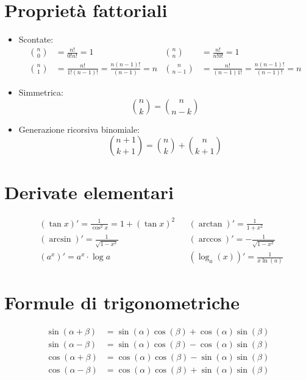  \section{Proprietà fattoriali}

\begin{itemize}
	\item Scontate:
	\begin{align*}
	\binom{n}{0} &=  \frac{n!}{0!n!}= 1 &  \binom{n}{n}&=  \frac{n!}{n!0!}= 1 \\
	\binom{n}{1} &=  \frac{n!}{1!\left( n-1 \right) !}=  \frac{n \left( n-1 \right) !}{\left( n-1 \right) }=n &  \binom{n}{n-1} &= \frac{n!}{\left( n-1 \right) 1!}= \frac{n\left( n-1 \right) !}{\left( n-1 \right) !}=n
	\end{align*}
	\item Simmetrica: 
	\[
	\binom{n}{k}= \binom{n}{n-k}
	\] 
	\item Generazione ricorsiva binomiale:
	\[
	\binom{n+1}{k+1} = \binom{n}{k} + \binom{n}{k+1}
	\]
\end{itemize}
\section{Derivate elementari}
\begin{align*}
	&\left( \tan x \right) ' = \frac{1}{\cos ^2 x}=  1 + \left( \tan x \right) ^2 && \left( \arctan  \right) ' =  \frac{1}{1+x^2}\\
	&\left( \arcsin \right) ' =  \frac{1}{\sqrt{1-x^2} }  &&\left( \arccos \right) ' =  -\frac{1}{\sqrt{1-x^2} }\\
	&\left( a^{x} \right) ' =  a^{x} \cdot \log a  && \left( \log _a \left( x \right)  \right) ' = \frac{1}{x \ln \left( a \right) }
\end{align*}

\section{Formule di trigonometriche}
\begin{align*}
	\sin \left( \alpha  + \beta  \right) &=  \sin \left( \alpha  \right) \cos \left( \beta  \right) + \cos \left( \alpha  \right) \sin \left( \beta  \right) \\
	\sin \left( \alpha - \beta  \right) &=  \sin \left( \alpha  \right) \cos \left( \beta  \right)  - \cos \left( \alpha  \right) \sin \left( \beta  \right)\\
	\cos \left( \alpha  + \beta  \right)  &=  \cos \left( \alpha  \right)  \cos \left( \beta   \right) - \sin  \left( \alpha  \right) \sin \left( \beta  \right) \\
	\cos \left( \alpha  - \beta  \right)  &=  \cos \left( \alpha  \right)  \cos \left( \beta  \right) + \sin \left( \alpha  \right) \sin  \left( \beta \right) 
\end{align*}
